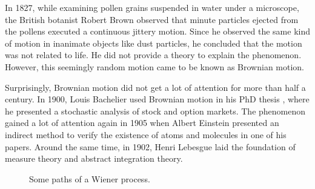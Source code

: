 
In 1827, while examining pollen grains suspended in water under a microscope, the British botanist Robert Brown observed that minute particles ejected from the pollens executed a continuous jittery motion\cite{Brown1828}. Since he observed the same kind of motion in inanimate objects like dust particles, he concluded that the motion was not related to life. He did not provide a theory to explain the phenomenon. However, this seemingly random motion came to be known as Brownian motion.

Surprisingly, Brownian motion did not get a lot of attention for more than half a century. In 1900, Louis Bachelier used Brownian motion in his PhD thesis \cite{Bachelier1900}, where he presented a stochastic analysis of stock and option markets. The phenomenon gained a lot of attention again in 1905 when Albert Einstein presented an indirect method to verify the existence of atoms and molecules in one of his papers\cite{Einstein1905}. Around the same time, in 1902, Henri Lebesgue laid the foundation of measure theory and abstract integration theory\cite{Lebesgue1902}.

\begin{figure}[h]
    \centering
    \caption{Some paths of a Wiener process.}
    \label{fig:Wiener_process_paths}
\end{figure}


